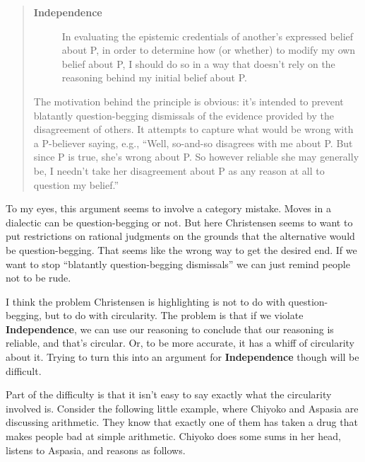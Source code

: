 \begin{quote}
\begin{description}
\item[\textbf{Independence}]

In evaluating the epistemic credentials of another's expressed belief about P, in order to determine how (or whether) to modify my own belief about P, I should do so in a way that doesn't rely on the reasoning behind my initial belief about P.
\end{description}
The motivation behind the principle is obvious: it's intended to prevent blatantly question-begging dismissals of the evidence provided by the disagreement of others. It attempts to capture what would be wrong with a P-believer saying, e.g., ``Well, so-and-so disagrees with me about P. But since P is true, she's wrong about P. So however reliable she may generally be, I needn't take her disagreement about P as any reason at all to question my belief.'' ~\citep[1-2]{Christensen2011}
\end{quote}
To my eyes, this argument seems to involve a category mistake. Moves in a dialectic can be question-begging or not. But here Christensen seems to want to put restrictions on rational judgments on the grounds that the alternative would be question-begging. That seems like the wrong way to get the desired end. If we want to stop ``blatantly question-begging dismissals'' we can just remind people not to be rude.

I think the problem Christensen is highlighting is not to do with question-begging, but to do with circularity. The problem is that if we violate \textbf{Independence}, we can use our reasoning to conclude that our reasoning is reliable, and that's circular. Or, to be more accurate, it has a whiff of circularity about it. Trying to turn this into an argument for \textbf{Independence} though will be difficult.

Part of the difficulty is that it isn't easy to say exactly what the circularity involved is. Consider the following little example, where \gls{Chiyoko} and \gls{Aspasia} are discussing arithmetic. They know that exactly one of them has taken a drug that makes people bad at simple arithmetic. \gls{Chiyoko} does some sums in her head, listens to \gls{Aspasia}, and reasons as follows.

